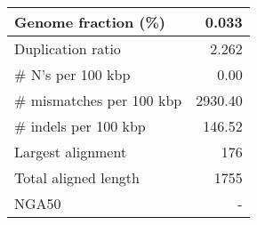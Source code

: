 \documentclass[12pt,a4paper]{article}
\begin{document}
\begin{table}[ht]
\begin{center}
\begin{tabular}{|l*{1}{|r}|}
Genome fraction (\%) & 0.033 \\ \hline
Duplication ratio & 2.262 \\ \hline
\# N's per 100 kbp & 0.00 \\ \hline
\# mismatches per 100 kbp & 2930.40 \\ \hline
\# indels per 100 kbp & 146.52 \\ \hline
Largest alignment & 176 \\ \hline
Total aligned length & 1755 \\ \hline
NGA50 & - \\ \hline
\end{tabular}
\end{center}
\end{table}
\end{document}
